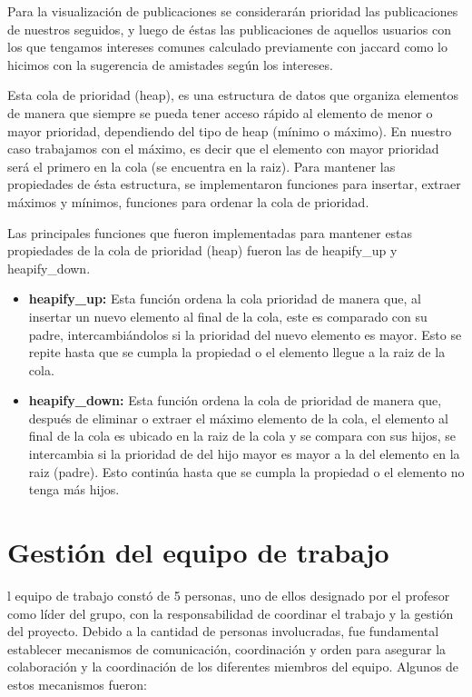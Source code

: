 \documentclass[9pt,letterpaper,onecolumn]{rho-class/rho}
\begin{document}
    Para la visualización de publicaciones se considerarán prioridad las publicaciones de nuestros seguidos, y luego de éstas las publicaciones de aquellos usuarios con los que tengamos intereses comunes calculado previamente con jaccard como lo hicimos con la sugerencia de amistades según los intereses.

    Esta cola de prioridad (heap), es una estructura de datos que organiza elementos de manera que siempre se pueda tener acceso rápido al elemento de menor o mayor prioridad, dependiendo del tipo de heap (mínimo o máximo). En nuestro caso trabajamos con el máximo, es decir que el elemento con mayor prioridad será el primero en la cola (se encuentra en la raiz). Para mantener las propiedades de ésta estructura, se implementaron funciones para insertar, extraer máximos y mínimos, funciones para ordenar la cola de prioridad.

    Las principales funciones que fueron implementadas para mantener estas propiedades de la cola de prioridad (heap) fueron las de heapify\_up y heapify\_down.

    \begin{itemize}
        \item \textbf{heapify\_up:} Esta función ordena la cola prioridad de manera que, al insertar un nuevo elemento al final de la cola, este es comparado con su padre, intercambiándolos si la prioridad del nuevo elemento es mayor. Esto se repite hasta que se cumpla la propiedad o el elemento llegue a la raiz de la cola.
        \item \textbf{heapify\_down:} Esta función ordena la cola de prioridad de manera que, después de eliminar o extraer el máximo elemento de la cola, el elemento al final de la cola es ubicado en la raiz de la cola y se compara con sus hijos, se intercambia si la prioridad de del hijo mayor es mayor a la del elemento en la raiz (padre). Esto continúa hasta que se cumpla la propiedad o el elemento no tenga más hijos.
    \end{itemize}

\newpage
\section{Gestión del equipo de trabajo}
    l equipo de trabajo constó de 5 personas, uno de ellos designado por el profesor como líder del grupo, con la responsabilidad de coordinar el trabajo y la gestión del proyecto. Debido a la cantidad de personas involucradas, fue fundamental establecer mecanismos de comunicación, coordinación y orden para asegurar la colaboración y la coordinación de los diferentes miembros del equipo. Algunos de estos mecanismos fueron:
\end{document}
